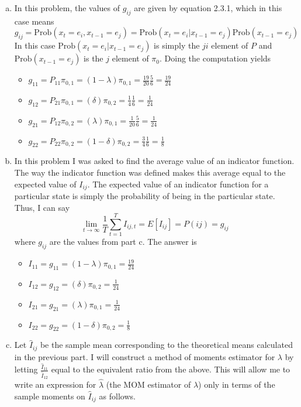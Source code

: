 \documentclass{homework}
\begin{document}
\begin{homeworkProblem}
{\begin{enumerate}[a.]
      \item In this problem, the values of $g_{ij}$ are given by equation 2.3.1, which in this case means
        $$g_{ij} = \text{Prob}(x_t=e_i, x_{t-1}=e_j) = \text{Prob}\left(x_t = e_i | x_{t-1} = e_j \right) \text{Prob}\left(x_{t-1} = e_j \right)$$ In this case $\text{Prob}\left(x_t = e_i | x_{t-1} = e_j \right)$ is simply the $ji$ element of $P$ and $\text{Prob}\left(x_{t-1} = e_j \right)$ is the $j$ element of $\pi_0$. Doing the computation yields
        \begin{itemize}
          \item $g_{11} = P_{11} \pi_{0, 1} = (1 - \lambda) \pi_{0, 1} = \frac{19}{20} \frac{5}{6} = \frac{19}{24}$
          \item $g_{12} = P_{21} \pi_{0, 1} = (\delta) \pi_{0, 2} = \frac{1}{4} \frac{1}{6} = \frac{1}{24}$
          \item $g_{21} = P_{12} \pi_{0, 2} = (\lambda) \pi_{0, 1} = \frac{1}{20} \frac{5}{6} = \frac{1}{24}$
          \item $g_{22} = P_{22} \pi_{0, 2} = (1 - \delta) \pi_{0, 2} = \frac{3}{4} \frac{1}{6} = \frac{1}{8}$
        \end{itemize}

      \item In this problem I was asked to find the average value of an indicator function. The way the indicator function was defined makes this average equal to the expected value of $I_{ij}$. The expected value of an indicator function for a particular state is simply the probability of being in the particular state. Thus, I can say
          $$\lim_{t \rightarrow \infty} \frac{1}{T} \sum_{t=1}^T I_{ij, t} = E\left[I_{ij}\right] =  P(ij) = g_{ij}$$
          where $g_{ij}$ are the values from part c. The answer is
          \begin{itemize}
            \item $I_{11} = g_{11} = (1 - \lambda) \pi_{0, 1} = \frac{19}{24}$
            \item $I_{12} = g_{12} = (\delta) \pi_{0, 2} =  \frac{1}{24}$
            \item $I_{21} = g_{21} = (\lambda) \pi_{0, 1} = \frac{1}{24}$
            \item $I_{22} = g_{22} = (1 - \delta) \pi_{0, 2} = \frac{1}{8}$
          \end{itemize}

      \item Let $\hat{I}_{ij}$ be the sample mean corresponding to the theoretical means calculated in the previous part. I will construct a method of moments estimator for $\lambda$ by letting $\frac{\hat{I}_{11}}{\hat{I}_{12}}$ equal to the equivalent ratio from the above. This will allow me to write an expression for $\hat{\lambda}$ (the MOM estimator of $\lambda$) only in terms of the sample moments on $\hat{I}_{ij}$ as follows.


\end{enumerate}}
\end{homeworkProblem}
\end{document}
